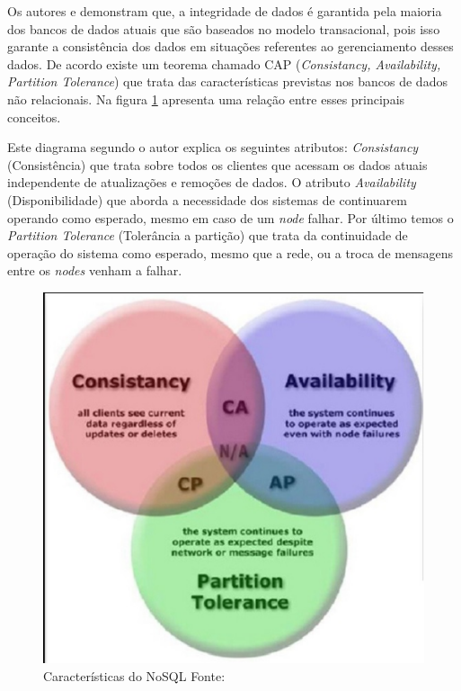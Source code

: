             Os autores  e  demonstram que, a integridade de dados
            é garantida pela maioria dos bancos de dados atuais que são baseados no modelo transacional, pois isso garante
            a consistência dos dados em situações referentes ao gerenciamento desses dados. De acordo
             existe um teorema chamado CAP (\textit{Consistancy, Availability, Partition Tolerance})
            que trata das características previstas nos bancos de dados não relacionais. Na figura \ref{figura9} apresenta uma
            relação entre esses principais conceitos.

            Este diagrama segundo o autor  explica os seguintes atributos: \textit{Consistancy}
            (Consistência) que trata sobre todos os clientes que acessam os dados atuais independente de atualizações e
            remoções de dados. O atributo \textit{Availability} (Disponibilidade) que aborda a necessidade dos sistemas de
            continuarem operando como esperado, mesmo em caso de um \textit{node} falhar. Por último temos o \textit{Partition
            Tolerance} (Tolerância a partição) que trata da continuidade de operação do sistema como esperado, mesmo que a rede,
            ou a troca de mensagens entre os \textit{nodes} venham a falhar.

            \begin{figure}[ht!]
                        \centering
                        \includegraphics[keepaspectratio=true,scale=0.5]
                            {figuras/figura9.eps}
                        \caption[Características do NoSQL]{Características do NoSQL
                        \protect \linebreak Fonte: }
                        \label{figura9}
            \end{figure}

